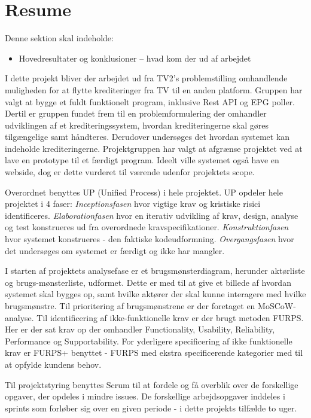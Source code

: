 \section{Resume}
Denne sektion skal indeholde:

\begin{itemize}
    \item Hovedresultater og konklusioner  – hvad kom der ud af arbejdet
\end{itemize}{}

I dette projekt bliver der arbejdet ud fra TV2's problemstilling omhandlende muligheden for at flytte krediteringer fra TV til en anden platform.  Gruppen har valgt at bygge et fuldt funktionelt program, inklusive Rest API og EPG poller. Dertil er gruppen fundet frem til en problemformulering der omhandler udviklingen af et krediteringssystem, hvordan krediteringerne skal gøres tilgængelige samt håndteres. Derudover undersøges det hvordan systemet kan indeholde krediteringerne.
Projektgruppen har valgt at afgrænse projektet ved at lave en prototype til et færdigt program. Ideelt ville systemet også have en webside, dog er dette vurderet til værende udenfor projektets scope.

Overordnet benyttes UP (Unified Process) i hele projektet. UP opdeler hele projektet i 4 faser: \textit{Inceptionsfasen} hvor vigtige krav og kristiske risici identificeres. \textit{Elaborationfasen} hvor en iterativ udvikling af krav, design, analyse og test konstrueres ud fra overordnede kravspecifikationer. \textit{Konstruktionfasen} hvor systemet konstrueres - den faktiske kodeudformning. \textit{Overgangsfasen} hvor det undersøges om systemet er færdigt og ikke har mangler.

I starten af projektets analysefase er et brugsmønsterdiagram, herunder aktørliste og brugs-mønsterliste, udformet. Dette er med til at give et billede af hvordan systemet skal bygges op, samt hvilke aktører der skal kunne interagere med hvilke brugsmønstre. Til prioritering af brugsmønstrene er der foretaget en MoSCoW-analyse.
Til identificering af ikke-funktionelle krav er der brugt metoden FURPS. Her er der sat krav op der omhandler Functionality, Usability, Reliability, Performance og Supportability. For yderligere specificering af ikke funktionelle krav er FURPS+ benyttet - FURPS med ekstra specificerende kategorier med til at opfylde kundens behov.

Til projektstyring benyttes Scrum til at fordele og få overblik over de forskellige opgaver, der opdeles i mindre issues. De forskellige arbejdsopgaver inddeles i sprints som forløber sig over en given periode - i dette projekts tilfælde to uger.



